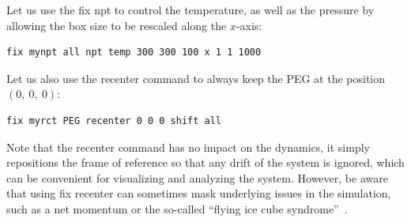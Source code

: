 \documentclass[9pt,tutorial]{livecoms}
\newcommand{\lmpcmd}[1]{\colorbox{listing}{\textcolor{command}{\small{#1}}}} %
\begin{document}
Let us use the \lmpcmd{fix npt} to control the temperature, as
well as the pressure by allowing the box size to be rescaled along the $x$-axis:
\begin{lstlisting}
fix mynpt all npt temp 300 300 100 x 1 1 1000
\end{lstlisting}
Let us also use the \lmpcmd{recenter} command to always keep the PEG at
the position $(0,~0,~0)$:
\begin{lstlisting}
fix myrct PEG recenter 0 0 0 shift all
\end{lstlisting}

\begin{note}
    {\color{blue}
    Note that the \lmpcmd{recenter} command has no impact on the dynamics,
    it simply repositions the frame of reference so that any drift of the
    system is ignored, which can be convenient for visualizing and analyzing
    the system. However, be aware that using \lmpcmd{fix recenter} can sometimes
    mask underlying issues in the simulation, such as a net momentum or the so-called
    ``flying ice cube syndrome''~\cite{wong2016good}.}
\end{note}
\end{document}
